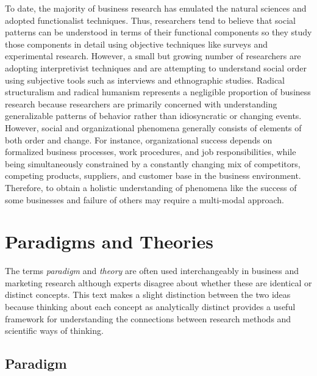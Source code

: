 \documentclass[]{book}
\theoremstyle{definition}
\theoremstyle{definition}
\theoremstyle{definition}
\theoremstyle{remark}
\begin{document}
To date, the majority of business research has emulated the natural
sciences and adopted functionalist techniques. Thus, researchers tend to
believe that social patterns can be understood in terms of their
functional components so they study those components in detail using
objective techniques like surveys and experimental research. However, a
small but growing number of researchers are adopting interpretivist
techniques and are attempting to understand social order using
subjective tools such as interviews and ethnographic studies. Radical
structuralism and radical humanism represents a negligible proportion of
business research because researchers are primarily concerned with
understanding generalizable patterns of behavior rather than
idiosyncratic or changing events. However, social and organizational
phenomena generally consists of elements of both order and change. For
instance, organizational success depends on formalized business
processes, work procedures, and job responsibilities, while being
simultaneously constrained by a constantly changing mix of competitors,
competing products, suppliers, and customer base in the business
environment. Therefore, to obtain a holistic understanding of phenomena
like the success of some businesses and failure of others may require a
multi-modal approach.

\hypertarget{paradigms-and-theories}{%
\section{Paradigms and Theories}\label{paradigms-and-theories}}

The terms \emph{paradigm} and \emph{theory} are often used
interchangeably in business and marketing research although experts
disagree about whether these are identical or distinct concepts. This
text makes a slight distinction between the two ideas because thinking
about each concept as analytically distinct provides a useful framework
for understanding the connections between research methods and
scientific ways of thinking.

\hypertarget{paradigm}{%
\subsection{Paradigm}\label{paradigm}}
\end{document}

